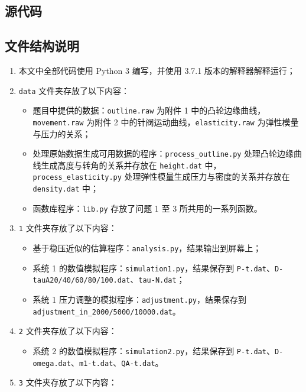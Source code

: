 \documentclass[withoutpreface,bwprint]{cumcmthesis}
\begin{document}
\newpage

\begin{appendices}

\section{源代码}
\subsection{文件结构说明}
\begin{enumerate}
    \item 本文中全部代码使用 Python 3 编写，并使用 3.7.1 版本的解释器解释运行；
	\item \verb|data| 文件夹存放了以下内容：
	\begin{itemize}
		\item 题目中提供的数据：\verb|outline.raw| 为附件 1 中的凸轮边缘曲线，\verb|movement.raw| 为附件 2 中的针阀运动曲线，\verb|elasticity.raw| 为弹性模量与压力的关系；
		\item 处理原始数据生成可用数据的程序：\verb|process_outline.py| 处理凸轮边缘曲线生成高度与转角的关系并存放在 \verb|height.dat| 中，\verb|process_elasticity.py| 处理弹性模量生成压力与密度的关系并存放在 \verb|density.dat| 中；
		\item 函数库程序：\verb|lib.py| 存放了问题 1 至 3 所共用的一系列函数。
	\end{itemize}
    \item \verb|1| 文件夹存放了以下内容：
	\begin{itemize}
		\item 基于稳压近似的估算程序：\verb|analysis.py|，结果输出到屏幕上；
		\item 系统 1 的数值模拟程序：\verb|simulation1.py|，结果保存到 \verb|P-t.dat|、\newline \verb|D-tauA20/40/60/80/100.dat|、\verb|tau-N.dat|；
		\item 系统 1 压力调整的模拟程序：\verb|adjustment.py|，结果保存到 \newline \verb|adjustment_in_2000/5000/10000.dat|。
	\end{itemize}
    \item \verb|2| 文件夹存放了以下内容：
	\begin{itemize}
		\item 系统 2 的数值模拟程序：\verb|simulation2.py|，结果保存到 \verb|P-t.dat|、\verb|D-omega.dat|、\verb|m1-t.dat|、\verb|QA-t.dat|。
	\end{itemize}
    \item \verb|3| 文件夹存放了以下内容：

\end{enumerate}
\end{appendices}
\end{document}
